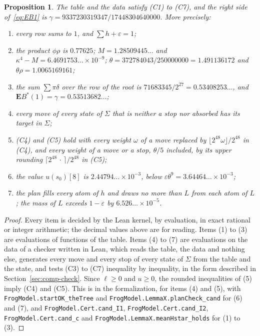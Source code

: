 \documentclass[11pt]{amsart}
\newtheorem{proposition}[theorem]{Proposition}
\theoremstyle{definition}
\numberwithin{equation}{section}
\newcommand{\lean}[1]{\ignorespaces}
\newcommand{\computed}[1]{\ignorespaces}
\newcommand{\E}{\mathbf{E}}
\newcommand{\cst}{\gamma}
\newcommand{\eps}{\varepsilon}
\begin{document}
\begin{proposition}\label{prop:cert}\lean{FrogModel.checkAll_theTree, FrogModel.startOK_theTree, FrogModel.LemmaX.planCheck_cand, FrogModel.Cert.cand_I1, FrogModel.Cert.cand_I2, FrogModel.Cert.cand_c, FrogModel.LemmaX.meanHstar_holds}\computed{code/certificate/run_gen.sh, code/certificate/out/gen.out, .github/workflows/ci.yml, code/gp/small_checks.gp, code/gp/small_checks.out, code/gp/start_values.gp, code/gp/start_values.out}
The table and the data satisfy (C1) to (C7), and the right side of~\eqref{eq:EB1} is $\cst=9337230319347/17448304640000$. More precisely:
\begin{enumerate}
\item every row sums to $1$, and $\sum h+\eps=1$;
\item the product $\phi\rho$ is $0.77625$; $M=1.28509445\ldots$ and $\kappa^4-M=6.4691753\ldots\times10^{-9}$; $\theta=372784043/250000000=1.491136172$ and $\theta\rho=1.0065169161$;
\item the sum $\sum\pi\delta$ over the row of the root is $71683345/2^{27}=0.53408253\ldots$, and $\E B^*(1)=\cst=0.53513682\ldots$;
\item every move of every state of $\Sigma$ that is neither a stop nor absorbed has its target in $\Sigma$;
\item (C4) and (C5) hold with every weight $\omega$ of a move replaced by $\lfloor2^{48}\omega\rfloor/2^{48}$ in (C4), and every weight of a move or a stop, $\theta/5$ included, by its upper rounding $\lceil2^{48}\,\cdot\,\rceil/2^{48}$ in (C5);
\item the value $u(s_0)[8]$ is $2.44794\ldots\times10^{-3}$, below $\eps\theta^9=3.64464\ldots\times10^{-3}$;
\item the plan fills every atom of $h$ and draws no more than $L$ from each atom of $L$; the mass of $L$ exceeds $1-\eps$ by $6.526\ldots\times10^{-5}$.
\end{enumerate}
\end{proposition}

\begin{proof}
Every item is decided by the Lean kernel, by evaluation, in exact rational or integer arithmetic; the decimal values above are for reading. Items (1) to (3) are evaluations of functions of the table. Items (4) to (7) are evaluations on the data of a checker written in Lean, which reads the table, the data and nothing else, generates every move and every stop of every state of $\Sigma$ from the table and the state, and tests (C3) to (C7) inequality by inequality, in the form described in Section~\ref{sec:comp-check}. Since $\ell\ge0$ and $u\ge0$, the rounded inequalities of (5) imply (C4) and (C5). This is  in the formalization, for items (4) and (5), with \texttt{FrogModel.startOK\_theTree} and \texttt{FrogModel.LemmaX.planCheck\_cand} for (6) and (7), and \texttt{FrogModel.Cert.cand\_I1}, \texttt{FrogModel.Cert.cand\_I2}, \texttt{FrogModel.Cert.cand\_c} and \texttt{FrogModel.LemmaX.meanHstar\_holds} for (1) to (3).
\end{proof}
\end{document}
